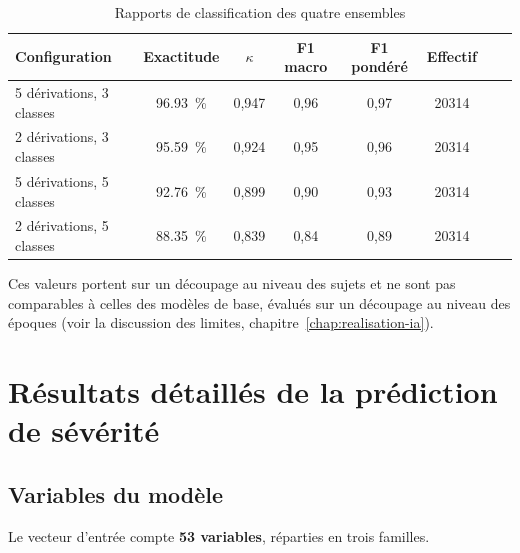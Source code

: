 \begin{table}[H]
\centering
\caption{Rapports de classification des quatre ensembles}
\label{tab:ann-rapport-stack}
\small
\begin{tabular}{@{}lccccccc@{}}
\toprule
\textbf{Configuration} & \textbf{Exactitude} & \textbf{$\kappa$} &
\textbf{F1 macro} & \textbf{F1 pondéré} & \textbf{Effectif} \\
\midrule
5 dérivations, 3 classes & \SI{96,93}{\percent} & 0,947 & 0,96 & 0,97 & \num{20314} \\
2 dérivations, 3 classes & \SI{95,59}{\percent} & 0,924 & 0,95 & 0,96 & \num{20314} \\
5 dérivations, 5 classes & \SI{92,76}{\percent} & 0,899 & 0,90 & 0,93 & \num{20314} \\
2 dérivations, 5 classes & \SI{88,35}{\percent} & 0,839 & 0,84 & 0,89 & \num{20314} \\
\bottomrule
\end{tabular}
\vspace{2pt}
\raggedright\footnotesize
Ces valeurs portent sur un découpage au niveau des sujets et ne sont pas comparables
à celles des modèles de base, évalués sur un découpage au niveau des époques
(voir la discussion des limites, chapitre~\ref{chap:realisation-ia}).
\end{table}

\clearpage
\chapter{Résultats détaillés de la prédiction de sévérité}
\label{annexe:osa}

\section{Variables du modèle}

Le vecteur d'entrée compte \textbf{53 variables}, réparties en trois familles.

